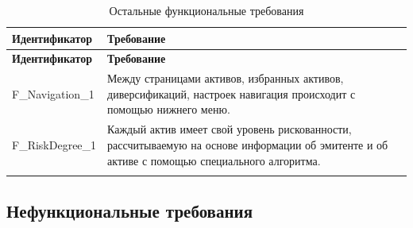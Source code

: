 \documentclass[a4paper, 14pt]{article}
\begin{document}
\begin{longtable}{| p{} | p{} |}
    \hline
    \textbf{Идентификатор}          & \textbf{Требование}                                                                                                                                                                \\
    \hline
    \endfirsthead
    \hline
    \textbf{Идентификатор}          & \textbf{Требование}                                                                                                                                                                \\
    \hline
    \endhead

    F\_Navigation\_1                & Между страницами активов, избранных активов, диверсификаций, настроек навигация происходит с помощью нижнего меню.                                                                 \\ \hline
    F\_RiskDegree\_1    & Каждый актив имеет свой уровень рискованности, рассчитываемую на основе информации об эмитенте и об активе с помощью специального алгоритма.                                                  \\ \hline

    \caption{Остальные функциональные требования}
\end{longtable}

\subsection{Нефункциональные требования}
\end{document}

